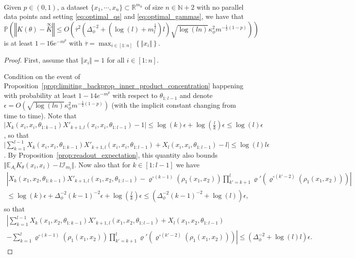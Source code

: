 \documentclass[twoside,11pt]{article}
\newcommand{\R}{\mathbb{R}}
\newcommand{\N}{\mathbb{N}}
\newcommand{\E}{\mathbb{E}}
\newcommand{\Prob}{\mathbb{P}}
\newcommand{\Id}{\mathcal{I}}
\newcommand{\limiting}[1]{\overset{\scriptscriptstyle\infty}{#1}}
\begin{document}
\begin{theorem}\label{thm:ntk_concentration}~\\
Given $p \in (0,1)$, a dataset $\{x_1,\cdots,x_n\} \subset \R^{m_0}$ of size $n \in \N+2$ with no parallel data points and setting \eqref{eq:optimal_qs} and \eqref{eq:optimal_gammas}, we have that
\[
\Prob\left( \left\Vert K(\theta) - \limiting{K} \right\Vert \leq O\left( \overline{\tau}^2 \left( \Delta_\phi^{-2} + \left( \log(l) + m_l^{\frac{1}{2}} \right) l \right) \sqrt{\log(ln)} \kappa_\phi^2 m^{-\frac{1}{2}(1-p)} \right) \right)
\]
is at least $1 - 16e^{-m^p}$ with $\overline{\tau} = \max_{i \in [1:n]}\left\{ \Vert x_i \Vert \right\}$.
\end{theorem}
\begin{proof}
First, assume that $\Vert x_i \Vert = 1$ for all $i \in [1:n]$.

Condition on the event of Proposition~\ref{prop:limiting_backprop_inner_product_concentration} happening with probability at least $1-14e^{-m^p}$ with respect to $\theta_{1:l-1}$ and denote $\epsilon = O\left( \sqrt{\log(ln)} \kappa_\phi^2 m^{-\frac{1}{2}(1-p)} \right)$ (with the implicit constant changing from time to time). Note that $\vert X_k(x_i,x_i,\theta_{1:k-1}) X'_{k+1,l}(x_i,x_i,\theta_{1 : l-1}) - 1 \vert \leq \log(k) \epsilon + \log(\frac{l}{k}) \epsilon \leq \log(l) \epsilon$, so that $\vert \sum_{k=1}^{l-1} X_k(x_i,x_i,\theta_{1:k-1}) X'_{k+1,l}(x_i,x_i,\theta_{1:l-1}) + X_l(x_i,x_i,\theta_{1:l-1}) - l \vert \leq \log(l) l \epsilon$. By Proposition~\ref{prop:readout_expectation}, this quantity also bounds $\Vert \E_{A_l} K_\theta(x_i,x_i) - l \Id_{m_l} \Vert$. Now also that for $k \in [1:l-1]$ we have
\begin{multline*}
\left\vert X_k(x_1,x_2,\theta_{1:k-1}) X'_{k+1,l}(x_1,x_2,\theta_{1:l-1}) - \varrho^{\circ (k-1)}(\rho_1(x_1,x_2)) \prod_{k'=k+1}^l \varrho'(\varrho^{\circ (k'-2)}(\rho_1(x_1,x_2))) \right\vert \\
\leq \log(k) \epsilon
+ \Delta_\phi^{-2} (k-1)^{-2} \epsilon 
+ \log\left( \frac{l}{k} \right) \epsilon 
\leq (\Delta_\phi^{-2} (k-1)^{-2} + \log(l)) \epsilon,
\end{multline*}
so that
\begin{multline*}
\left\vert \sum_{k=1}^{l-1} X_k(x_1,x_2,\theta_{1:k-1}) X'_{k+1,l}(x_1,x_2,\theta_{1:l-1}) + X_l(x_1,x_2,\theta_{1:l-1}) 
\right. \\ \left.
- \sum_{k=1}^l \varrho^{\circ (k-1)}(\rho_1(x_1,x_2)) \prod_{k'=k+1}^l \varrho'(\varrho^{\circ (k'-2)}(\rho_1(x_1,x_2))) \right\vert 
\leq (\Delta_\phi^{-2} + \log(l) l) \epsilon.
\end{multline*}


\end{proof}
\end{document}
